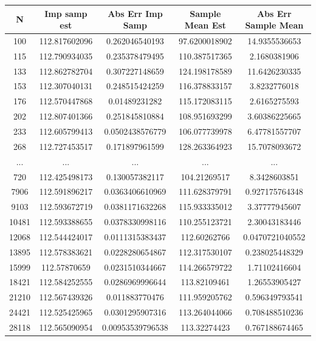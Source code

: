 \documentclass[a4paper,11pt]{article}
\begin{document}
\begin{table}[ht]
\centering
\label{table:1b}
\begin{tabular}{|c|c|c|c|c|}
\hline
\textbf{N} & \textbf{Imp samp est}&\textbf{Abs Err Imp Samp}&\textbf{Sample Mean Est}&\textbf{Abs Err Sample Mean} \\ \hline
    100 & 112.817602096 & 0.262046540193 & 97.6200018902 & 14.9355536653 \\
    115 & 112.790934035 & 0.235378479495 & 110.387517365 & 2.1680381906 \\
    133 & 112.862782704 & 0.307227148659 & 124.198178589 & 11.6426230335 \\
    153 & 112.307040131 & 0.248515424259 & 116.378833157 & 3.8232776018 \\
    176 & 112.570447868 & 0.01489231282 & 115.172083115 & 2.6165275593 \\
    202 & 112.807401366 & 0.251845810884 & 108.951693299 & 3.60386225665 \\
    233 & 112.605799413 & 0.0502438576779 & 106.077739978 & 6.47781557707 \\
    268 & 112.727453517 & 0.171897961599 & 128.263364923 & 15.7078093672 \\
   ...&...&...&...&...\\
    720 & 112.425498173 & 0.130057382117 & 104.21269517 & 8.3428603851 \\
    7906 & 112.591896217 & 0.0363406610969 & 111.628379791 & 0.927175764348 \\
    9103 & 112.593672719 & 0.0381171632268 & 115.933335012 & 3.37777945607 \\
    10481 & 112.593388655 & 0.0378330998116 & 110.255123721 & 2.30043183446 \\
    12068 & 112.544424017 & 0.0111315383437 & 112.60262766 & 0.0470721040552 \\
    13895 & 112.578383621 & 0.0228280654867 & 112.317530107 & 0.238025448329 \\
    15999 & 112.57870659 & 0.0231510344667 & 114.266579722 & 1.71102416604 \\
    18421 & 112.584252555 & 0.0286969996644 & 113.82109461 & 1.26553905427 \\
    21210 & 112.567439326 & 0.011883770476 & 111.959205762 & 0.596349793541 \\
    24421 & 112.525425965 & 0.0301295907316 & 113.264044066 & 0.708488510236 \\
    28118 & 112.565090954 & 0.00953539796538 & 113.32274423 & 0.767188674465 \\

\end{tabular}
\end{table}
\end{document}
